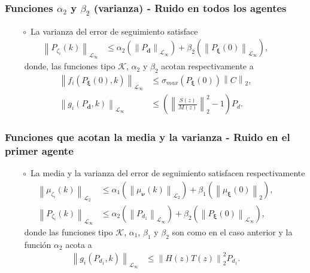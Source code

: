 \documentclass[aspectratio=169,dvipsnames]{beamer}
\newcommand\norm[1]{\left\lVert#1\right\rVert}
\begin{document}
\begin{frame}{}
\frametitle{Funciones $\alpha_2$ y $\beta_2$ (varianza) - Ruido en todos los agentes}
\vspace{3mm}
$\qquad \circ$ La varianza del error de seguimiento satisface
    \begin{align}
        \norm{P_{\zeta_i}(k)}_{\mathcal{L}_\infty} &\leq \alpha_2 (\norm{P_{\bm{d}}}_{\mathcal{L}_\infty})+\beta_2(\norm{P_{\bm{\xi}}(0)}_{\mathcal{L}_\infty}),
    \end{align}
$\qquad $ donde, las funciones tipo $\mathcal{K}$, $\alpha_2$ y $\beta_2$ acotan respectivamente a
\begin{align}
    \label{eq:alpha2_all}
   \norm{ f_i(P_{\bm{\xi}}(0),k)}_{\mathcal{L}_\infty} &\leq  \sigma_{max} (P_{\bm{\xi}}(0)) \norm{C}_2, \\
    \label{eq:beta2_all}
    \norm{g_i(P_{\bm{d}},k)}_{\mathcal{L}_\infty} &\leq 
     \left( \norm{ \frac{S(z)}{M(z)}}_2^2 -1 \right) P_d.
\end{align}
\end{frame}


\begin{frame}{}
\frametitle{Funciones que acotan la media y la varianza - Ruido en el primer agente}
\vspace{3mm}
$\qquad \circ$ La media y la varianza del error de seguimiento satisfacen respectivamente
    \begin{align}
        \norm{\mu_{\zeta_i}(k)}_{\mathcal{L}_2} &\leq \alpha_1(\norm{\mu_{\bm{\nu}}(k)}_{\mathcal{L}_2})+\beta_1(\norm{\mu_{\bm{\xi}}(0)}_2), \\
        \norm{P_{\zeta_i}(k)}_{\mathcal{L}_\infty} &\leq \alpha_2 (\norm{P_{d_1}}_{\mathcal{L}_\infty})+\beta_2(\norm{P_{\bm{\xi}}(0)}_{\mathcal{L}_\infty}),
    \end{align}
$\qquad $ donde las funciones tipo $\mathcal{K}$, $\alpha_1$, $\beta_1$ y  $\beta_2$ son como en el caso anterior y la \\
$\qquad $ función $\alpha_2$ acota a
\begin{align}
    \label{eq:alpha2_lider}
    \norm{g_i(P_{d_1},k)}_{\mathcal{L}_\infty} &\leq 
    \norm{ H(z)T(z)}_2^{2} P_{d_1}.
\end{align}
\end{frame}
\end{document}
